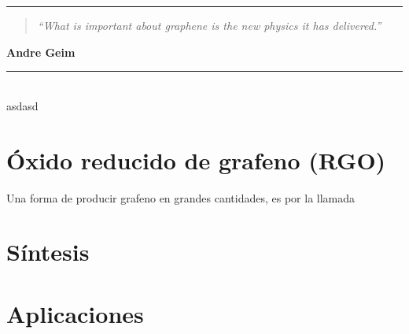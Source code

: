 \noindent
\rule{\linewidth}{1 pt}
\begin{flushright}
	\begin{quotation}
		\small{
			\textit{``What is important about graphene is the new physics it has delivered.''}}
	\end{quotation}
	\bf{Andre Geim}
\end{flushright}
\noindent
\rule{\linewidth}{1 pt}\\
\vfill
asdasd
\section{Óxido reducido de grafeno (RGO)}
Una forma de producir grafeno en grandes cantidades, es por la llamada
\section{Síntesis}

\section{Aplicaciones}